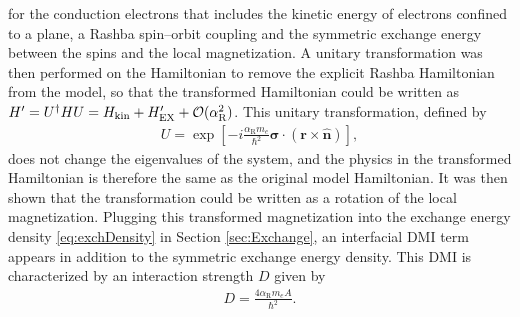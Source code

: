 for the conduction electrons that includes the kinetic energy of electrons confined to a plane, a Rashba spin--orbit coupling and the symmetric exchange energy between the spins and the local magnetization. A unitary transformation was then performed on the Hamiltonian to remove the explicit Rashba Hamiltonian from the model, so that the transformed Hamiltonian could be written as $H' = U^{\dagger} H U = H_{\textrm{kin}} + H_{\text{EX}}' + \mathcal{O}(\alpha_{\text{R}}^2)$. This unitary transformation, defined by
\begin{align}
U = \exp\left[-i\frac{\alpha_{\text{R}} m_e}{\hbar^2}\mathbold{\sigma}\cdot(\mathbold{r}\times\mathbold{\hat{n}})\right],
\end{align}
does not change the eigenvalues of the system, and the physics in the transformed Hamiltonian is therefore the same as the original model Hamiltonian. It was then shown that the transformation could be written as a rotation of the local magnetization. Plugging this transformed magnetization into the exchange energy density \eqref{eq:exchDensity} in Section \ref{sec:Exchange}, an interfacial DMI term appears in addition to the symmetric exchange energy density. This DMI is characterized by an interaction strength $D$ given by
\begin{align}
\label{eq:DalphaR}
D = \frac{4\alpha_{\text{R}}m_e A}{\hbar^2}.
\end{align}

